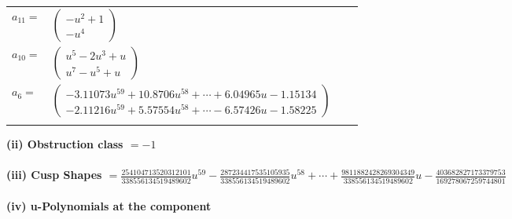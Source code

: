 \documentclass[1p]{elsarticle_modified}
\theoremstyle{definition}
\begin{document}
\begin{tabular}{m{7pt} m{180pt} m{7pt} m{180pt} }
\flushright $a_{11}=$&$\begin{pmatrix}- u^2+1\\- u^4\end{pmatrix}$ \\
\flushright $a_{10}=$&$\begin{pmatrix}u^5-2 u^3+u\\u^7- u^5+u\end{pmatrix}$ \\
\flushright $a_{6}=$&$\begin{pmatrix}-3.11073 u^{59}+10.8706 u^{58}+\cdots+6.04965 u-1.15134\\-2.11216 u^{59}+5.57554 u^{58}+\cdots-6.57426 u-1.58225\end{pmatrix}$\\&\end{tabular}
\flushleft \textbf{(ii) Obstruction class $= -1$}\\~\\
\flushleft \textbf{(iii) Cusp Shapes $= \frac{254104713520312101}{338556134519489602} u^{59}-\frac{287234417535105935}{338556134519489602} u^{58}+\cdots+\frac{9811882428269304349}{338556134519489602} u-\frac{403682827173379753}{169278067259744801}$}\\~\\
\newpage\renewcommand{\arraystretch}{1}
\flushleft \textbf{(iv) u-Polynomials at the component}\newline \\
\end{document}
